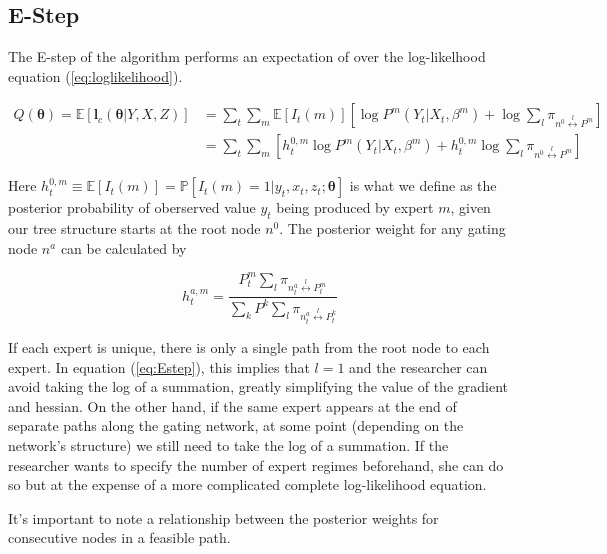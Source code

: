 \documentclass[12pt]{article}
\begin{document}
\subsection{E-Step}
The E-step of the algorithm performs an expectation of over the log-likelhood
equation (\ref{eq:loglikelihood}).

\begin{equation} \label{eq:Estep}
  \begin{split}
  Q(\boldsymbol{\theta}) = \mathbb{E}\left[\boldsymbol{l}_{c}(\boldsymbol{\theta}|Y,X,Z)\right] & = \sum_{t}\sum_{m} \mathbb{E}\left[I_{t}(m)\right] [\log P^{m}(Y_{t}|X_{t},\beta^{m}) + \log\sum_{l}\pi_{n^{0}\overset{l}{\longleftrightarrow} P^{m}}] \\
   & = \sum_{t}\sum_{m} [h^{0,m}_{t} \log P^{m}(Y_{t}|X_{t},\beta^{m}) + h^{0,m}_{t} \log \sum_{l}\pi_{n^{0}\overset{l}{\longleftrightarrow} P^{m}}]
 \end{split}
\end{equation}

Here $h^{0,m}_{t} \equiv \mathbb{E}\left[I_{t}(m)\right] = \mathbb{P}[I_{t}(m) = 1| y_{t}, x_{t}, z_{t}; \boldsymbol{\theta}]$
is what we define as the posterior probability of oberserved value $y_{t}$ being
produced by expert $m$, given our tree structure starts at the root node $n^{0}$.
The posterior weight for any gating node $n^{a}$ can be calculated by

\begin{equation} \label{eq:posteriornode}
  h^{a,m}_{t} = \frac{P^{m}_{t}\sum_{l}\pi_{n^{a}_{t}\overset{l}{\longleftrightarrow} P^{m}_{t}}}{\sum_{k}P^{k}\sum_{l}\pi_{n^{a}_{t}\overset{l}{\longleftrightarrow} P^{k}_{t}}}
\end{equation}

If each expert is unique, there is only a single path from the root node to each
expert. In equation (\ref{eq:Estep}), this implies that $l = 1$ and the researcher
can avoid taking the log of a summation, greatly simplifying the value of the
gradient and hessian. On the other hand, if the same expert appears at the end of
separate paths along the gating network, at some point (depending on the network's
structure) we still need to take the log of a summation. If the researcher wants
to specify the number of expert regimes beforehand, she can do so but at the
expense of a more complicated complete log-likelihood equation.

It's important to note a relationship between the posterior weights for consecutive
nodes in a feasible path.
\end{document}
